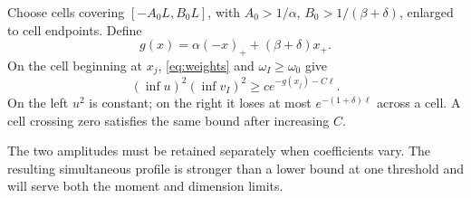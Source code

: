 \documentclass[11pt]{article}
\numberwithin{equation}{section}
\begin{document}
Choose cells covering $[-A_0L,B_0L]$, with
$A_0>1/\alpha$, $B_0>1/(\beta+\delta)$, enlarged to cell endpoints.
Define
\[
 g(x)=\alpha(-x)_++(\beta+\delta)x_+.
\]
On the cell beginning at $x_j$, \eqref{eq:weights} and
$\omega_I\ge\omega_0$ give
\begin{equation}\label{eq:minweights}
 (\inf u)^2(\inf v_I)^2\ge c e^{-g(x_j)-C\ell}.
\end{equation}
On the left $u^2$ is constant; on the right it loses at most
$e^{-(1+\delta)\ell}$ across a cell. A cell crossing zero satisfies
the same bound after increasing $C$.

The two amplitudes must be retained separately when coefficients vary.
The resulting simultaneous profile is stronger than a lower bound at
one threshold and will serve both the moment and dimension limits.
\end{document}
